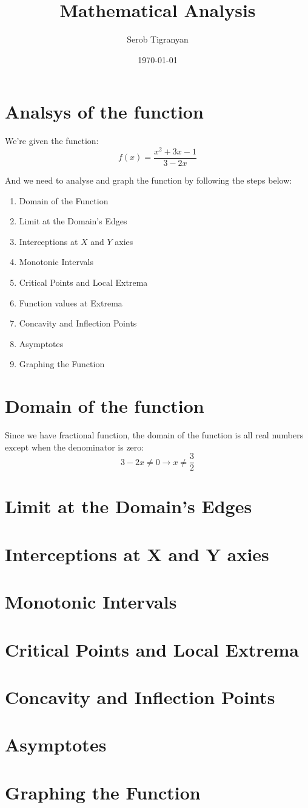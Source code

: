\documentclass[11pt]{article}
\author{Serob Tigranyan}
\date{\today}
\title{Mathematical Analysis}
\begin{document}
\maketitle
\tableofcontents

\newpage
\section{Analsys of the function}
\label{sec:org578098d}
We're given the function:
\[
f(x) = \frac{x^2+3x-1}{3-2x}
\]

And we need to analyse and graph the function by following the steps below:
\begin{enumerate}
\item Domain of the Function
\item Limit at the Domain's Edges
\item Interceptions at \(X\) and \(Y\) axies
\item Monotonic Intervals
\item Critical Points and Local Extrema
\item Function values at Extrema
\item Concavity and Inflection Points
\item Asymptotes
\item Graphing the Function
\end{enumerate}
\section{Domain of the function}
\label{sec:org5cf4103}
Since we have fractional function, the domain of the function is all real numbers except when the denominator is zero:
\[
3-2x \neq 0 \rightarrow x \neq \frac{3}{2}
\]
\section{Limit at the Domain's Edges}
\label{sec:org09346df}
\section{Interceptions at X and Y axies}
\label{sec:orgfff794d}
\section{Monotonic Intervals}
\label{sec:org15b867c}
\section{Critical Points and Local Extrema}
\label{sec:org6535a98}
\section{Concavity and Inflection Points}
\label{sec:orgbfcf72c}
\section{Asymptotes}
\label{sec:orgd6a4e38}
\section{Graphing the Function}
\label{sec:orgc08c607}
\end{document}
